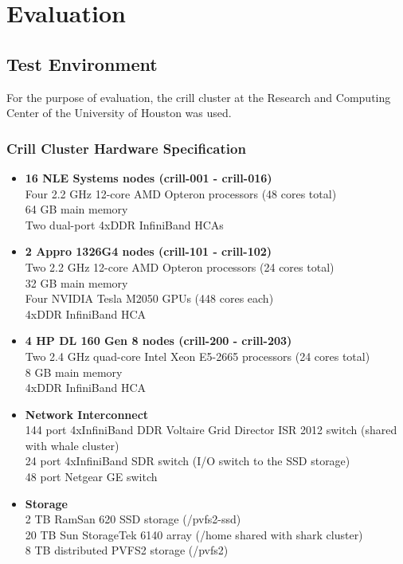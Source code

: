 \chapter{Evaluation}
\label{sec:Evaluation}

\section{Test Environment}
For the purpose of evaluation, the crill cluster at the Research and Computing Center of the University of Houston was used.

\subsection{Crill Cluster Hardware Specification}
\begin{itemize}
\item \textbf{16 NLE Systems nodes (crill-001 - crill-016)}\\
  Four 2.2 GHz 12-core AMD Opteron processors (48 cores total)\\
  64 GB main memory\\
  Two dual-port 4xDDR InfiniBand HCAs

\item \textbf{2 Appro 1326G4 nodes (crill-101 - crill-102)}\\
  Two 2.2 GHz 12-core AMD Opteron processors (24 cores total)\\
  32 GB main memory\\
  Four NVIDIA Tesla M2050 GPUs (448 cores each)\\
  4xDDR InfiniBand HCA

\item \textbf{4 HP DL 160 Gen 8 nodes (crill-200 - crill-203)}\\
  Two 2.4 GHz quad-core Intel Xeon E5-2665 processors (24 cores total)\\
  8 GB main memory\\
  4xDDR InfiniBand HCA
  
\item \textbf{Network Interconnect}\\
  144 port 4xInfiniBand DDR Voltaire Grid Director ISR 2012 switch (shared with whale cluster)\\
  24 port 4xInfiniBand SDR switch (I/O switch to the SSD storage)\\
  48 port Netgear GE switch

\item \textbf{Storage}\\
  2 TB RamSan 620 SSD storage (/pvfs2-ssd)\\
  20 TB Sun StorageTek 6140 array (/home shared with shark cluster)\\
  8 TB distributed PVFS2 storage (/pvfs2)
  
\end{itemize}

